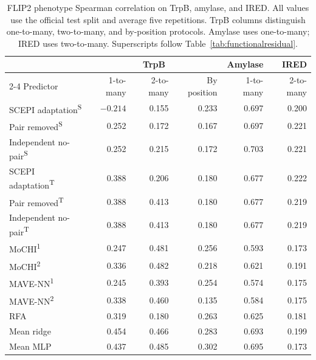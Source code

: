\documentclass{llncs}
\begin{document}
\begin{table}[H]
\centering
\setlength{\tabcolsep}{4.5pt}
\caption{FLIP2 phenotype Spearman correlation on TrpB, amylase, and IRED. All values use the official test split and average five repetitions. TrpB columns distinguish one-to-many, two-to-many, and by-position protocols. Amylase uses one-to-many; IRED uses two-to-many. Superscripts follow Table~\ref{tab:functionalresidual}.}
\label{tab:flipenzymes}
\begin{tabular}{lrrrrr}
\toprule
 & \multicolumn{3}{c}{TrpB} & Amylase & IRED \\
\cmidrule(lr){2-4}
Predictor & 1-to-many & 2-to-many & By position & 1-to-many & 2-to-many \\
\midrule
SCEPI adaptation\textsuperscript{S} & $-0.214$ & 0.155 & 0.233 & 0.697 & 0.200 \\
Pair removed\textsuperscript{S} & 0.252 & 0.172 & 0.167 & 0.697 & 0.221 \\
Independent no-pair\textsuperscript{S} & 0.252 & 0.215 & 0.172 & 0.703 & 0.221 \\
SCEPI adaptation\textsuperscript{T} & 0.388 & 0.206 & 0.180 & 0.677 & 0.222 \\
Pair removed\textsuperscript{T} & 0.388 & 0.413 & 0.180 & 0.677 & 0.219 \\
Independent no-pair\textsuperscript{T} & 0.388 & 0.413 & 0.180 & 0.677 & 0.219 \\
MoCHI\textsuperscript{1} & 0.247 & 0.481 & 0.256 & 0.593 & 0.173 \\
MoCHI\textsuperscript{2} & 0.336 & 0.482 & 0.218 & 0.621 & 0.191 \\
MAVE-NN\textsuperscript{1} & 0.245 & 0.393 & 0.254 & 0.574 & 0.175 \\
MAVE-NN\textsuperscript{2} & 0.338 & 0.460 & 0.135 & 0.584 & 0.175 \\
RFA & 0.319 & 0.180 & 0.263 & 0.625 & 0.181 \\
Mean ridge & 0.454 & 0.466 & 0.283 & 0.693 & 0.199 \\
Mean MLP & 0.437 & 0.485 & 0.302 & 0.695 & 0.173 \\
\bottomrule
\end{tabular}
\end{table}
\end{document}
